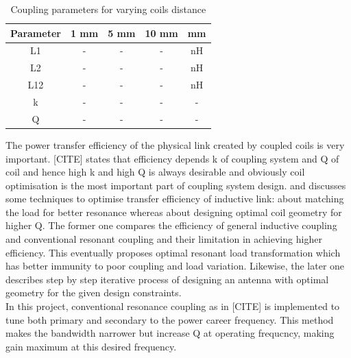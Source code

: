 \documentclass[12pt,a4paper,UKenglish]{article}
\begin{document}
\begin{table}[H]
\caption{Coupling parameters for varying coils distance} 
\begin{center}
\begin{tabular}{c|c|c|c|c}
\hline \hline
Parameter 	& 1 mm	& 5 mm 	& 10 mm	 & \si{\milli\meter}\\ \hline
L1		& -	& -	& -	 & \si{\nano\henry} \\ \hline
L2		& -	& -	& -	 & \si{\nano\henry} \\ \hline
L12		& -	& -	& -	 & \si{\nano\henry} \\ \hline
k		& -	& -	& -	 & -		    \\ \hline
Q		& -	& -	& -	 & -		    \\
\hline \hline
\end{tabular}
\end{center}
\label{tab:ant_couple_parameter}
\end{table}%


The power transfer efficiency of the physical link created by coupled coils is very important. [CITE] states 
that efficiency depends k of coupling system and Q of coil and hence high k and high Q is always desirable and obviously coil optimisation 
is the most important part of coupling system design. \cite{ant_optimal_resonance} and \cite{ant_PSC_geometry} discusses some techniques to 
optimise transfer efficiency of inductive link: \cite{ant_optimal_resonance} about matching the load for better resonance whereas 
\cite{ant_PSC_geometry} about designing optimal coil geometry for higher Q. The former one compares the efficiency of general inductive coupling 
and conventional resonant coupling and their limitation in achieving higher efficiency. This eventually proposes 
optimal resonant load transformation which has better immunity to poor coupling and load variation. Likewise, the later one 
describes step by step iterative process of designing an antenna with optimal geometry for the given 
design constraints. \\


In this project, conventional resonance coupling as in [CITE] is implemented to tune both primary and secondary 
to the power career frequency. This method makes the bandwidth narrower but increase Q at operating frequcncy, 
making gain maximum at this desired frequency. \\
\end{document}
